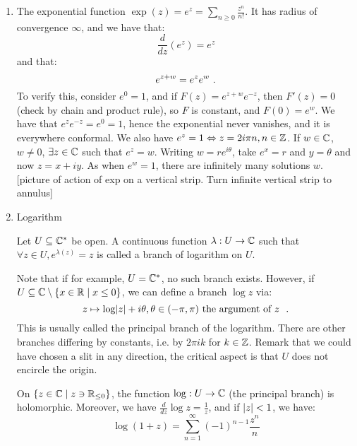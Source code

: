 \begin{enumerate}
\item The exponential function $\exp(z) = e^z = \sum_{n \geq 0} \frac{z^n}{n!}$. It has radius of convergence $\infty$, and we have that:
\[
\frac{d}{dz} (e^z) = e^z
\]
and that:
\[
e^{z+w} = e^ze^w \ \text{.}
\]
To verify this, consider $e^0 = 1$, and if $F(z) = e^{z+w}e^{-z}$, then $F'(z) = 0$ (check by chain and product rule), so $F$ is constant, and $F(0) = e^w$. 
We have that $e^ze^{-z} = e^0 = 1$, hence the exponential never vanishes, and it is everywhere conformal.
We also have $e^z = 1 \Leftrightarrow z = 2i\pi{}n, n \in \mathbb{Z}$. 
If $w \in \mathbb{C}$, $w \neq 0$, $\exists z \in \mathbb{C}$ such that $e^z = w$. Writing $w = re^{i\theta}$, take $e^x = r$ and $y = \theta$ and now $z = x + iy$. As when $e^w = 1$, there are infinitely many solutions $w$.
[picture of action of exp on a vertical strip. Turn infinite vertical strip to annulus]

\item Logarithm
  \begin{definition}
    Let $U \subseteq \mathbb{C}^*$ be open. A continuous function $\lambda : U \rightarrow \mathbb{C}$ such that $\forall z \in U, e^{\lambda(z)} = z$ is called a branch of logarithm on $U$. 
  \end{definition}
  Note that if for example, $U = \mathbb{C}^*$, no such branch exists. However, if $U \subseteq \mathbb{C} \setminus \{x \in \mathbb{R} \mid x \leq 0\}$, we can define a branch $\log z$ via:
\[
z \mapsto \log \lvert z\rvert + i\theta, \theta \in (-\pi, \pi) \text{ the argument of $z$ }\ \text{.}
\]
This is usually called the principal branch of the logarithm. There are other branches differing by constants, i.e. by $2\pi{}ik$ for $k \in \mathbb{Z}$.
Remark that we could have chosen a slit in any direction, the critical aspect is that $U$ does not encircle the origin.

\begin{proposition}
  On $\{ z \in \mathbb{C} \mid z \ni \mathbb{R}_{\leq 0} \}$, the function $\log : U \rightarrow \mathbb{C}$ (the principal branch) is holomorphic. Moreover, we have $\frac{d}{dz} \log z = \frac{1}{z}$, and if $\lvert z\rvert < 1$, we have:
\[
\log (1 + z) = \sum_{n = 1}^\infty (-1)^{n-1}\frac{z^n}{n}
\]
\end{proposition}
\end{enumerate}


